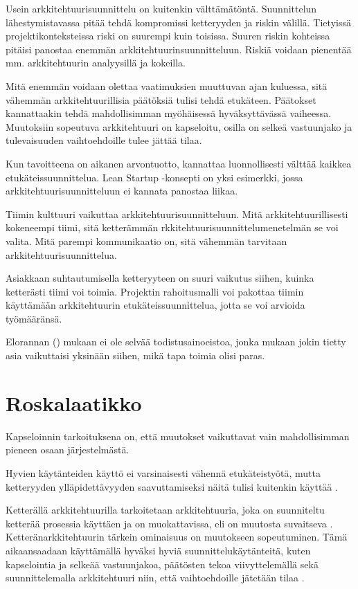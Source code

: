 Usein arkkitehtuurisuunnittelu on kuitenkin välttämätöntä. Suunnittelun lähestymistavassa pitää tehdä kompromissi ketteryyden ja riskin välillä. Tietyissä projektikonteksteissa riski on suurempi kuin toisissa. Suuren riskin kohteissa pitäisi panostaa enemmän arkkitehtuurinsuunnitteluun. Riskiä voidaan pienentää mm. arkkitehtuurin analyysillä ja kokeilla.

Mitä enemmän voidaan olettaa vaatimuksien muuttuvan ajan kuluessa, sitä vähemmän arkkitehtuurillisia päätöksiä tulisi tehdä etukäteen. Päätokset kannattaakin tehdä mahdollisimman myöhäisessä hyväksyttävässä vaiheessa. Muutoksiin sopeutuva arkkitehtuuri on kapseloitu, osilla on selkeä vastuunjako ja tulevaisuuden vaihtoehdoille tulee jättää tilaa.

Kun tavoitteena on aikanen arvontuotto, kannattaa luonnollisesti välttää kaikkea etukäteissuunnittelua. Lean Startup -konsepti on yksi esimerkki, jossa arkkitehtuurisuunnitteluun ei kannata panostaa liikaa.

Tiimin kulttuuri vaikuttaa arkkitehtuurisuunnitteluun. Mitä arkkitehtuurillisesti kokeneempi tiimi, sitä ketterämmän rkkitehtuurisuunnittelumenetelmän se voi valita. Mitä parempi kommunikaatio on, sitä vähemmän tarvitaan arkkitehtuurisuunnittelua.

Asiakkaan suhtautumisella ketteryyteen on suuri vaikutus siihen, kuinka ketterästi tiimi voi toimia. Projektin rahoitusmalli voi pakottaa tiimin käyttämään arkkitehtuurin etukäteissuunnittelua, jotta se voi arvioida työmääränsä.

Elorannan (\citeyear{eloranta2015techniques}) mukaan ei ole selvää todistusainoeistoa, jonka mukaan jokin tietty asia vaikuttaisi yksinään siihen, mikä tapa toimia olisi paras.

\iffalse
\chapter{Roskalaatikko}

Kapseloinnin tarkoituksena on, että muutokset vaikuttavat vain mahdollisimman pieneen osaan järjestelmästä. 

Hyvien käytänteiden käyttö ei varsinaisesti vähennä etukäteistyötä, mutta ketteryyden ylläpidettävyyden saavuttamiseksi näitä tulisi kuitenkin käyttää \citep{waterman_agility_2018_a}. 

Ketterällä arkkitehtuurilla tarkoitetaan arkkitehtuuria, joka on suunniteltu ketterää prosessia käyttäen ja on muokattavissa, eli on muutosta suvaitseva \citep{waterman_how_2015}. Ketteränarkkitehtuurin tärkein ominaisuus on muutokseen sopeutuminen. Tämä aikaansaadaan käyttämällä hyväksi hyviä suunnittelukäytänteitä, kuten kapselointia ja selkeää vastuunjakoa, päätösten tekoa viivyttelemällä sekä suunnittelemalla arkkitehtuuri niin, että vaihtoehdoille jätetään tilaa \citep{waterman_agility_2018_a}. 


